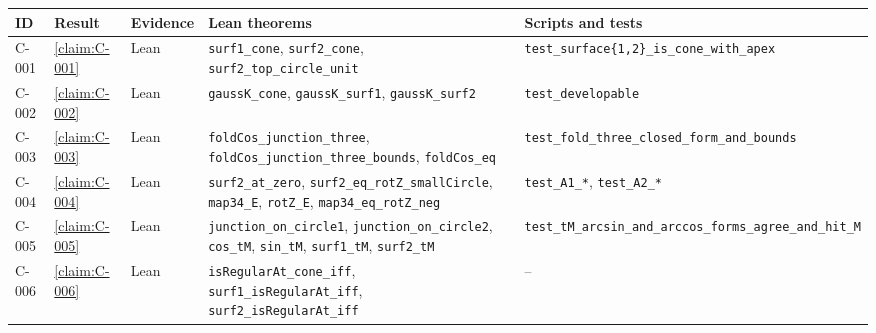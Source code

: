 \setlength{\LTleft}{0pt}\setlength{\LTright}{0pt}
\begin{longtable}{@{}l>{\raggedright}p{}>{\raggedright}p{}>{\raggedright}p{}>{\raggedright\arraybackslash}p{}@{}}
\toprule
\textbf{ID} & \textbf{Result} & \textbf{Evidence} & \textbf{Lean theorems} & \textbf{Scripts and tests}\\\midrule\endhead
\bottomrule\endfoot
C-001 & \cref{claim:C-001} & Lean & \texttt{surf1\_\allowbreak{}cone}, \texttt{surf2\_\allowbreak{}cone}, \texttt{surf2\_\allowbreak{}top\_\allowbreak{}circle\_\allowbreak{}unit} & \texttt{test\_\allowbreak{}surface\{1,2\}\_\allowbreak{}is\_\allowbreak{}cone\_\allowbreak{}with\_\allowbreak{}apex}\\
C-002 & \cref{claim:C-002} & Lean & \texttt{gaussK\_\allowbreak{}cone}, \texttt{gaussK\_\allowbreak{}surf1}, \texttt{gaussK\_\allowbreak{}surf2} & \texttt{test\_\allowbreak{}developable}\\
C-003 & \cref{claim:C-003} & Lean & \texttt{foldCos\_\allowbreak{}junction\_\allowbreak{}three}, \texttt{foldCos\_\allowbreak{}junction\_\allowbreak{}three\_\allowbreak{}bounds}, \texttt{foldCos\_\allowbreak{}eq} & \texttt{test\_\allowbreak{}fold\_\allowbreak{}three\_\allowbreak{}closed\_\allowbreak{}form\_\allowbreak{}and\_\allowbreak{}bounds}\\
C-004 & \cref{claim:C-004} & Lean & \texttt{surf2\_\allowbreak{}at\_\allowbreak{}zero}, \texttt{surf2\_\allowbreak{}eq\_\allowbreak{}rotZ\_\allowbreak{}smallCircle}, \texttt{map34\_\allowbreak{}E}, \texttt{rotZ\_\allowbreak{}E}, \texttt{map34\_\allowbreak{}eq\_\allowbreak{}rotZ\_\allowbreak{}neg} & \texttt{test\_\allowbreak{}A1\_\allowbreak{}*}, \texttt{test\_\allowbreak{}A2\_\allowbreak{}*}\\
C-005 & \cref{claim:C-005} & Lean & \texttt{junction\_\allowbreak{}on\_\allowbreak{}circle1}, \texttt{junction\_\allowbreak{}on\_\allowbreak{}circle2}, \texttt{cos\_\allowbreak{}tM}, \texttt{sin\_\allowbreak{}tM}, \texttt{surf1\_\allowbreak{}tM}, \texttt{surf2\_\allowbreak{}tM} & \texttt{test\_\allowbreak{}tM\_\allowbreak{}arcsin\_\allowbreak{}and\_\allowbreak{}arccos\_\allowbreak{}forms\_\allowbreak{}agree\_\allowbreak{}and\_\allowbreak{}hit\_\allowbreak{}M}\\
C-006 & \cref{claim:C-006} & Lean & \texttt{isRegularAt\_\allowbreak{}cone\_\allowbreak{}iff}, \texttt{surf1\_\allowbreak{}isRegularAt\_\allowbreak{}iff}, \texttt{surf2\_\allowbreak{}isRegularAt\_\allowbreak{}iff} & --\\

\end{longtable}
